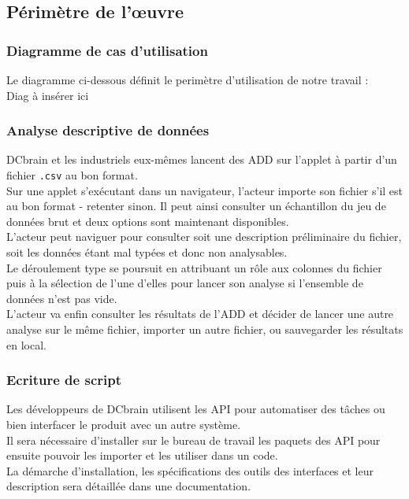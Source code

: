 		\subsection{Périmètre de l'œuvre}
		
			\subsubsection{Diagramme de cas d'utilisation}
				Le diagramme ci-dessous définit le perimètre d'utilisation de notre travail :\\
					{\color{red} Diag à insérer ici}
				
			\subsubsection{Analyse descriptive de données}
				DCbrain et les industriels eux-mêmes lancent des ADD sur l'applet à partir d'un fichier \lstinline!.csv! au bon format.\\
				Sur une applet s'exécutant dans un navigateur, l'acteur importe son fichier s'il est au bon format - retenter sinon. Il peut ainsi consulter un échantillon du jeu de données brut et deux options sont maintenant disponibles.\\
				L'acteur peut naviguer pour consulter soit une description préliminaire du fichier, soit les données étant mal typées et donc non analysables.\\
				Le déroulement type se poursuit en attribuant un rôle aux colonnes du fichier puis à la sélection de l'une d'elles pour lancer son analyse si l'ensemble de données n'est pas vide.\\
				L'acteur va enfin consulter les résultats de l'ADD et décider de lancer une autre analyse sur le même fichier, importer un autre fichier, ou sauvegarder les résultats en local.
				
			\subsubsection{Ecriture de script}
				Les développeurs de DCbrain utilisent les API pour automatiser des tâches ou bien interfacer le produit avec un autre système.\\
				Il sera nécessaire d'installer sur le bureau de travail les paquets des API pour ensuite pouvoir les importer et les utiliser dans un code.\\
				La démarche d'installation, les spécifications des outils des interfaces et leur description sera détaillée dans une documentation.
				
